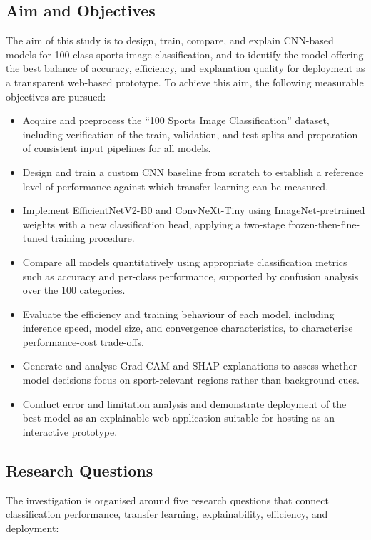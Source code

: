 \subsection{Aim and Objectives}
\label{sec:intro-aim}

The aim of this study is to design, train, compare, and explain CNN-based models for 100-class sports image classification, and to identify the model offering the best balance of accuracy, efficiency, and explanation quality for deployment as a transparent web-based prototype.
To achieve this aim, the following measurable objectives are pursued:

\begin{itemize}
  \item Acquire and preprocess the ``100 Sports Image Classification'' dataset, including verification of the train, validation, and test splits and preparation of consistent input pipelines for all models.
  \item Design and train a custom CNN baseline from scratch to establish a reference level of performance against which transfer learning can be measured.
  \item Implement EfficientNetV2-B0 and ConvNeXt-Tiny using ImageNet-pretrained weights with a new classification head, applying a two-stage frozen-then-fine-tuned training procedure.
  \item Compare all models quantitatively using appropriate classification metrics such as accuracy and per-class performance, supported by confusion analysis over the 100 categories.
  \item Evaluate the efficiency and training behaviour of each model, including inference speed, model size, and convergence characteristics, to characterise performance-cost trade-offs.
  \item Generate and analyse Grad-CAM and SHAP explanations to assess whether model decisions focus on sport-relevant regions rather than background cues.
  \item Conduct error and limitation analysis and demonstrate deployment of the best model as an explainable web application suitable for hosting as an interactive prototype.
\end{itemize}

\subsection{Research Questions}
\label{sec:intro-rq}

The investigation is organised around five research questions that connect classification performance, transfer learning, explainability, efficiency, and deployment:

